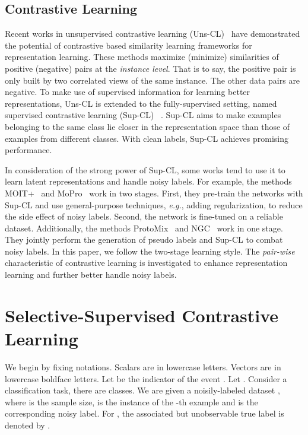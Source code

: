 \documentclass[10pt,twocolumn,letterpaper]{article}
\begin{document}
\subsection{Contrastive Learning}
Recent works in unsupervised contrastive learning (Uns-CL)~\cite{chen2020simple,chen2020big,He0WXG20,wang2021cris} have demonstrated the potential of contrastive based similarity learning frameworks for representation learning. These methods maximize (minimize) similarities of positive (negative) pairs at the \textit{instance level}. That is to say, the positive pair is only built by two correlated views of the same instance. The other data pairs are negative. To make use of supervised information for learning better representations, Uns-CL is extended to the fully-supervised setting, named supervised contrastive learning (Sup-CL) ~\cite{Khosla2020}. Sup-CL aims to make examples belonging to the same class lie closer in the representation space than those of examples from different classes. With clean labels, Sup-CL achieves promising performance. 

In consideration of the strong power of Sup-CL, some works tend to use it to learn latent representations and handle noisy labels. For example, the methods MOIT+~\cite{Ortego2021} and MoPro~\cite{Li2021ICLR} work in two stages. First, they pre-train the networks with Sup-CL and use general-purpose techniques, \textit{e.g.}, adding regularization, to reduce the side effect of noisy labels. Second, the network is fine-tuned on a reliable dataset. Additionally, the methods ProtoMix~\cite{li2020learning} and NGC~\cite{Zhi2021ICCV} work in one stage. They jointly perform the generation of pseudo labels and Sup-CL to combat noisy labels. In this paper, we follow the two-stage learning style. The \textit{pair-wise} characteristic of contrastive learning is investigated to enhance representation learning and further better handle noisy labels. 
\vspace{-3pt}
\section{Selective-Supervised Contrastive Learning}\label{sec:3}


We begin by fixing notations. Scalars are in lowercase letters. Vectors are in lowercase boldface letters. Let  be the indicator of the event . Let . 
Consider a classification task, there are  classes. We are given a noisily-labeled dataset , where  is the sample size,  is the instance of the -th example and  is the corresponding noisy label. For , the associated but unobservable true label is denoted by . 
\end{document}
